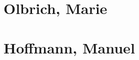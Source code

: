 \documentclass[a4paper, 11pt, fleqn, DIV=10, twoside, BCOR=10mm]{scrreprt}
\begin{document}
\section{Olbrich, Marie}
 
\section{Hoffmann, Manuel}
 
\end{document}
